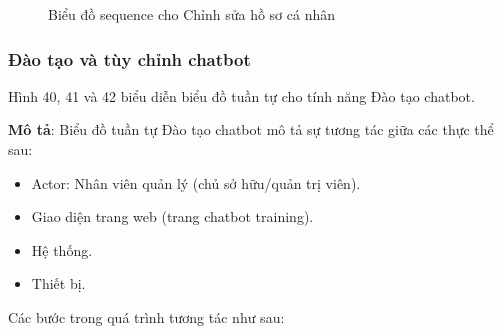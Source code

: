 \begin{figure}[H]
	\centering
	
	\vspace{0.5cm}
	\caption{Biểu đồ sequence cho Chỉnh sửa hồ sơ cá nhân}
	\label{fig:enter-label}
\end{figure}



\subsubsection{Đào tạo và tùy chỉnh chatbot}
Hình 40, 41 và 42 biểu diễn biểu đồ tuần tự cho tính năng Đào tạo chatbot.

\textbf{Mô tả}: Biểu đồ tuần tự Đào tạo chatbot mô tả sự tương tác giữa các thực thể sau:
\begin{itemize}
	\item Actor: Nhân viên quản lý (chủ sở hữu/quản trị viên).
	\item Giao diện trang web (trang chatbot training).
	\item Hệ thống.
	\item Thiết bị.
\end{itemize}
Các bước trong quá trình tương tác như sau:
